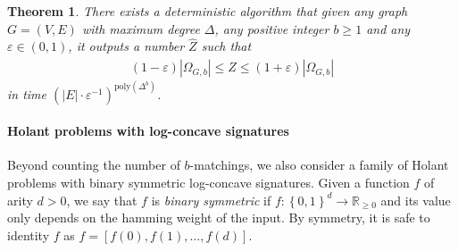 \documentclass[11pt]{article}
\newtheorem{theorem}{Theorem}
\newcommand{\abs}[1]{\left\vert#1\right\vert}
\newcommand{\set}[1]{\left\{#1\right\}}
\def\poly{\mathrm{poly}}
\newcommand{\wh}[1]{\widehat{#1}}
\begin{document}
\begin{theorem} \label{thm:counting-b-matchings}
    There exists a deterministic algorithm that given any graph $G = (V, E)$ with maximum degree $\Delta$, any positive integer $b \ge 1$ and any $\varepsilon \in (0, 1)$, it outputs a number $\wh{Z}$ such that
    \begin{align*}
        (1 - \varepsilon)\abs{\Omega_{G, b}} \le \wh{Z} \le (1 + \varepsilon) \abs{\Omega_{G, b}}
    \end{align*}
    in time $(\abs{E} \cdot \varepsilon^{-1})^{\poly(\Delta^b)}$.
\end{theorem}

\paragraph{Holant problems with log-concave signatures}

Beyond counting the number of $b$-matchings, we also consider a family of Holant problems with binary symmetric log-concave signatures. Given a function $f$ of arity $d > 0$, we say that $f$ is \emph{binary symmetric} if $f : \set{0, 1}^d \to \mathbb R_{\ge 0}$ and its value only depends on the hamming weight of the input. By symmetry, it is safe to identity $f$ as $f = [f(0), f(1), \ldots, f(d)]$.
\end{document}
